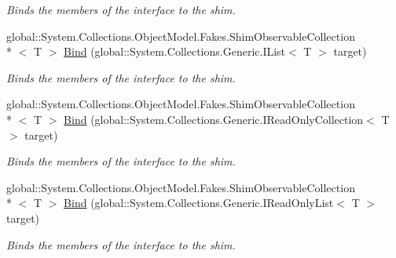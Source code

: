 \begin{DoxyCompactItemize}
\begin{DoxyCompactList}\small\item\em Binds the members of the interface to the shim.\end{DoxyCompactList}\item 
global\-::\-System.\-Collections.\-Object\-Model.\-Fakes.\-Shim\-Observable\-Collection\\*
$<$ T $>$ \hyperlink{class_system_1_1_collections_1_1_object_model_1_1_fakes_1_1_shim_observable_collection_3_01_t_01_4_a4129b255f43e3b9255db5aba9f4b0603}{Bind} (global\-::\-System.\-Collections.\-Generic.\-I\-List$<$ T $>$ target)
\begin{DoxyCompactList}\small\item\em Binds the members of the interface to the shim.\end{DoxyCompactList}\item 
global\-::\-System.\-Collections.\-Object\-Model.\-Fakes.\-Shim\-Observable\-Collection\\*
$<$ T $>$ \hyperlink{class_system_1_1_collections_1_1_object_model_1_1_fakes_1_1_shim_observable_collection_3_01_t_01_4_a5acb551efa530b88f62b2d1631818f3e}{Bind} (global\-::\-System.\-Collections.\-Generic.\-I\-Read\-Only\-Collection$<$ T $>$ target)
\begin{DoxyCompactList}\small\item\em Binds the members of the interface to the shim.\end{DoxyCompactList}\item 
global\-::\-System.\-Collections.\-Object\-Model.\-Fakes.\-Shim\-Observable\-Collection\\*
$<$ T $>$ \hyperlink{class_system_1_1_collections_1_1_object_model_1_1_fakes_1_1_shim_observable_collection_3_01_t_01_4_adcd1738f76624a9624161698e4055b87}{Bind} (global\-::\-System.\-Collections.\-Generic.\-I\-Read\-Only\-List$<$ T $>$ target)
\begin{DoxyCompactList}\small\item\em Binds the members of the interface to the shim.\end{DoxyCompactList}\end{DoxyCompactItemize}
